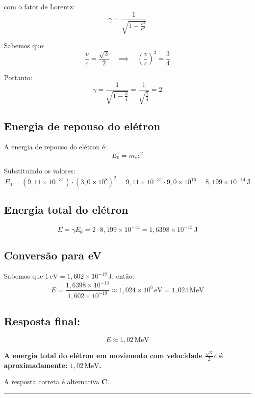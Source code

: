\begin{flushleft}
com o fator de Lorentz:
\[
\gamma = \frac{1}{\sqrt{1 - \frac{v^2}{c^2}}}
\]

Sabemos que:
\[
\frac{v}{c} = \frac{\sqrt{3}}{2} \quad \implies \quad \left( \frac{v}{c} \right)^2 = \frac{3}{4}
\]

Portanto:
\[
\gamma = \frac{1}{\sqrt{1 - \frac{3}{4}}} =
\frac{1}{\sqrt{\frac{1}{4}}} =
2
\]

\subsection*{Energia de repouso do elétron}

A energia de repouso do elétron é:
\[
E_0 = m_e c^2
\]

Substituindo os valores:
\[
E_0 =
\left( 9{,}11 \times 10^{-31} \right) \cdot
\left( 3{,}0 \times 10^8 \right)^2 =
9{,}11 \times 10^{-31} \cdot 9{,}0 \times 10^{16} =
8{,}199 \times 10^{-14}\, \mathrm{J}
\]

\subsection*{Energia total do elétron}

\[
E = \gamma E_0 =
2 \cdot 8{,}199 \times 10^{-14} =
1{,}6398 \times 10^{-13}\, \mathrm{J}
\]

\subsection*{Conversão para eV}

Sabemos que \(1\,\mathrm{eV} = 1{,}602 \times 10^{-19}\, \mathrm{J}\), então:
\[
E =
\frac{1{,}6398 \times 10^{-13}}{1{,}602 \times 10^{-19}} \approx
1{,}024 \times 10^6\, \mathrm{eV} =
1{,}024\,\mathrm{MeV}
\]

\subsection*{Resposta final:}

\[
\boxed{
E \approx 1{,}02\, \mathrm{MeV}
}
\]

\textbf{A energia total do elétron em movimento com velocidade \( \frac{\sqrt{3}}{2}c \) é aproximadamente: \(1{,}02\,\mathrm{MeV}\).}

A resposta correta é alternativa \colorbox{green!50}{\textbf{C}}.
\end{flushleft}

\noindent\rule{\linewidth}{0.6pt}\\

